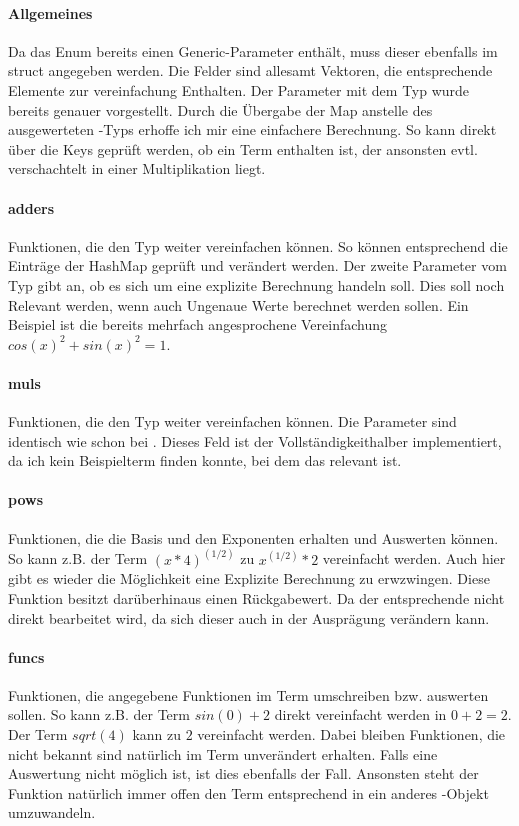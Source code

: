 \documentclass[11pt,a4paper, ngerman]{article}
\begin{document}
\paragraph{Allgemeines} Da das Enum  bereits einen Generic-Parameter enthält, muss dieser ebenfalls im struct angegeben werden. Die Felder sind allesamt Vektoren, die entsprechende Elemente zur vereinfachung Enthalten. Der Parameter mit dem Typ  wurde bereits genauer vorgestellt. Durch die Übergabe der Map anstelle des ausgewerteten -Typs erhoffe ich mir eine einfachere Berechnung. So kann direkt über die Keys geprüft werden, ob ein Term enthalten ist, der ansonsten evtl. verschachtelt in einer Multiplikation liegt.

\paragraph{adders} Funktionen, die den Typ  weiter vereinfachen können. So können entsprechend die Einträge der HashMap geprüft und verändert werden. Der zweite Parameter vom Typ  gibt an, ob es sich um eine explizite Berechnung handeln soll. Dies soll noch Relevant werden, wenn auch Ungenaue Werte berechnet werden sollen. Ein Beispiel ist die bereits mehrfach angesprochene Vereinfachung $cos(x)^2+sin(x)^2 = 1$.

\paragraph{muls} Funktionen, die den Typ  weiter vereinfachen können. Die Parameter sind identisch wie schon bei . Dieses Feld ist der Vollständigkeithalber implementiert, da ich kein Beispielterm finden konnte, bei dem das relevant ist.

\paragraph{pows} Funktionen, die die Basis und den Exponenten erhalten und Auswerten können. So kann z.B. der Term $(x*4)^(1/2)$ zu $x^(1/2)*2$ vereinfacht werden. Auch hier gibt es wieder die Möglichkeit eine Explizite Berechnung zu erwzwingen. Diese Funktion besitzt darüberhinaus einen Rückgabewert. Da der entsprechende  nicht direkt bearbeitet wird, da sich dieser auch in der Ausprägung verändern kann.

\paragraph{funcs} Funktionen, die angegebene Funktionen im Term umschreiben bzw. auswerten sollen. So kann z.B. der Term $sin(0) + 2$ direkt vereinfacht werden in $0 + 2 = 2$. Der Term $sqrt(4)$ kann zu $2$ vereinfacht werden. Dabei bleiben Funktionen, die  nicht bekannt sind natürlich im Term unverändert erhalten. Falls eine Auswertung nicht möglich ist, ist dies ebenfalls der Fall. Ansonsten steht der Funktion natürlich immer offen den Term entsprechend in ein anderes -Objekt umzuwandeln.
\end{document}

